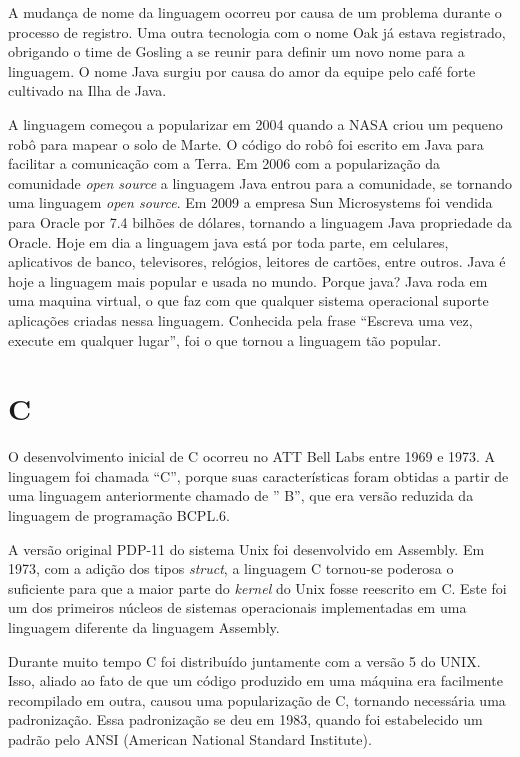 \documentclass[
    12pt,               %
    openright,          %
    twoside,            %
    a4paper,            %
    brazil              %
    ]{abntex2}
\begin{document}
A mudança de nome da linguagem ocorreu por causa de um problema durante o
processo de registro.  Uma outra tecnologia com o nome Oak já estava
registrado, obrigando o time de Gosling a se reunir para definir um novo nome
para a linguagem. O nome Java surgiu por causa do amor da equipe pelo café
forte cultivado na Ilha de Java. \cite{CursoJava}

A linguagem começou a popularizar em 2004 quando a NASA criou um pequeno robô
para mapear o solo de Marte. O código do robô foi escrito em Java para facilitar
a comunicação com a Terra. Em 2006 com a popularização da comunidade
\textit{open source} a linguagem Java entrou para a comunidade, se tornando uma
linguagem \textit{open source}.  Em 2009 a empresa Sun Microsystems foi vendida
para Oracle por 7.4 bilhões de dólares, tornando a linguagem Java propriedade da
Oracle. Hoje em dia a linguagem java está por toda parte, em celulares,
aplicativos de banco, televisores, relógios, leitores de cartões, entre outros.
Java é hoje a linguagem mais popular e usada no mundo.  Porque java?  Java roda
em uma maquina virtual, o que faz com que qualquer sistema operacional suporte
aplicações criadas nessa linguagem. Conhecida pela frase “Escreva uma vez,
execute em qualquer lugar”, foi o que tornou a linguagem tão popular. \cite{JavaWiki} 


\section{C}

O desenvolvimento inicial de C ocorreu no ATT Bell Labs entre 1969 e 1973. A
linguagem foi chamada “C”, porque suas características foram obtidas a partir
de uma linguagem anteriormente chamado de ” B”, que era versão reduzida da
linguagem de programação BCPL.6.

A versão original PDP-11 do sistema Unix foi desenvolvido em Assembly. Em 1973,
com a adição dos tipos \textit{struct}, a linguagem C tornou-se poderosa o
suficiente para que a maior parte do \textit{kernel} do Unix fosse reescrito em
C. Este foi um dos primeiros núcleos de sistemas operacionais implementadas em
uma linguagem diferente da linguagem Assembly. 

Durante muito tempo C foi distribuído juntamente com a versão 5 do UNIX. Isso,
aliado ao fato de que um código produzido em uma máquina era facilmente
recompilado em outra, causou uma popularização de C, tornando necessária uma
padronização. Essa padronização se deu em 1983, quando foi estabelecido um
padrão pelo ANSI (American National Standard Institute).
\end{document}
